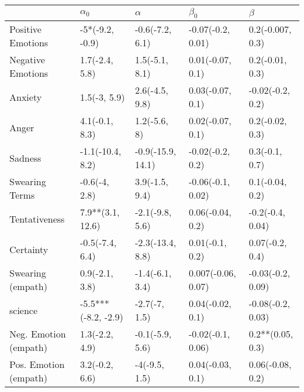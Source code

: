 \begin{tabular}{lllll}
\toprule
{} &           $\alpha_0$ &           $\alpha$ &           $\beta_0$ &            $\beta$ \\
\midrule
Positive Emotions     &      -5*(-9.2, -0.9) &    -0.6(-7.2, 6.1) &   -0.07(-0.2, 0.01) &   0.2(-0.007, 0.3) \\
Negative Emotions     &       1.7(-2.4, 5.8) &     1.5(-5.1, 8.1) &    0.01(-0.07, 0.1) &    0.2(-0.01, 0.3) \\
Anxiety               &         1.5(-3, 5.9) &     2.6(-4.5, 9.8) &    0.03(-0.07, 0.1) &   -0.02(-0.2, 0.2) \\
Anger                 &       4.1(-0.1, 8.3) &       1.2(-5.6, 8) &    0.02(-0.07, 0.1) &    0.2(-0.02, 0.3) \\
Sadness               &     -1.1(-10.4, 8.2) &  -0.9(-15.9, 14.1) &    -0.02(-0.2, 0.2) &     0.3(-0.1, 0.7) \\
Swearing Terms        &        -0.6(-4, 2.8) &     3.9(-1.5, 9.4) &   -0.06(-0.1, 0.02) &    0.1(-0.04, 0.2) \\
Tentativeness         &     7.9**(3.1, 12.6) &    -2.1(-9.8, 5.6) &    0.06(-0.04, 0.2) &   -0.2(-0.4, 0.04) \\
Certainty             &      -0.5(-7.4, 6.4) &   -2.3(-13.4, 8.8) &     0.01(-0.1, 0.2) &    0.07(-0.2, 0.4) \\
Swearing (empath)     &       0.9(-2.1, 3.8) &    -1.4(-6.1, 3.4) &  0.007(-0.06, 0.07) &  -0.03(-0.2, 0.09) \\
science               &  -5.5***(-8.2, -2.9) &      -2.7(-7, 1.5) &    0.04(-0.02, 0.1) &  -0.08(-0.2, 0.03) \\
Neg. Emotion (empath) &       1.3(-2.2, 4.9) &    -0.1(-5.9, 5.6) &   -0.02(-0.1, 0.06) &   0.2**(0.05, 0.3) \\
Pos. Emotion (empath) &       3.2(-0.2, 6.6) &      -4(-9.5, 1.5) &    0.04(-0.03, 0.1) &   0.06(-0.08, 0.2) \\
\bottomrule
\end{tabular}
